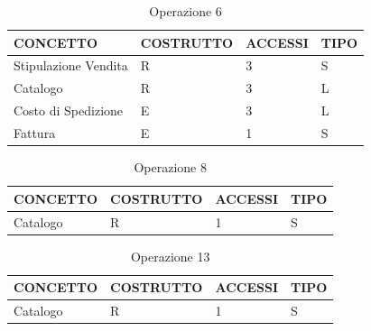 \begin{table}[H]
\centering
\caption{Operazione 6}
\begin{tabular}{llll}
\\ \hline
\multicolumn{1}{|l|}{\textbf{CONCETTO}} & \multicolumn{1}{l|}{\textbf{COSTRUTTO}} & \multicolumn{1}{l|}{\textbf{ACCESSI}} & \multicolumn{1}{l|}{\textbf{TIPO}} \\ \hline
\multicolumn{1}{|l|}{Stipulazione Vendita}
& \multicolumn{1}{l|}{R}                  & \multicolumn{1}{l|}{3}                & \multicolumn{1}{l|}{S}             \\ \hline
\multicolumn{1}{|l|}{Catalogo}             & \multicolumn{1}{l|}{R}                  & \multicolumn{1}{l|}{3}
& \multicolumn{1}{l|}{L}
			 \\ \hline
\multicolumn{1}{|l|}{Costo di Spedizione}     & \multicolumn{1}{l|}{E}                  & \multicolumn{1}{l|}{3}      & \multicolumn{1}{l|}{L}
			 \\ \hline
\multicolumn{1}{|l|}{Fattura}
& \multicolumn{1}{l|}{E}                  & \multicolumn{1}{l|}{1}                & \multicolumn{1}{l|}{S}             \\ \hline
\end{tabular}
\end{table}

\begin{table}[H]
\centering
\caption{Operazione 8}
\begin{tabular}{llll}
\\ \hline
\multicolumn{1}{|l|}{\textbf{CONCETTO}} & \multicolumn{1}{l|}{\textbf{COSTRUTTO}} & \multicolumn{1}{l|}{\textbf{ACCESSI}} & \multicolumn{1}{l|}{\textbf{TIPO}} \\ \hline
\multicolumn{1}{|l|}{Catalogo}
& \multicolumn{1}{l|}{R}                  & \multicolumn{1}{l|}{1}                & \multicolumn{1}{l|}{S}             \\ \hline
\end{tabular}
\end{table}

\begin{table}[H]
\centering
\caption{Operazione 13}
\begin{tabular}{llll}
\\ \hline
\multicolumn{1}{|l|}{\textbf{CONCETTO}} & \multicolumn{1}{l|}{\textbf{COSTRUTTO}} & \multicolumn{1}{l|}{\textbf{ACCESSI}} & \multicolumn{1}{l|}{\textbf{TIPO}} \\ \hline
\multicolumn{1}{|l|}{Catalogo}
& \multicolumn{1}{l|}{R}                  & \multicolumn{1}{l|}{1}                & \multicolumn{1}{l|}{S}             \\ \hline
\end{tabular}
\end{table}


